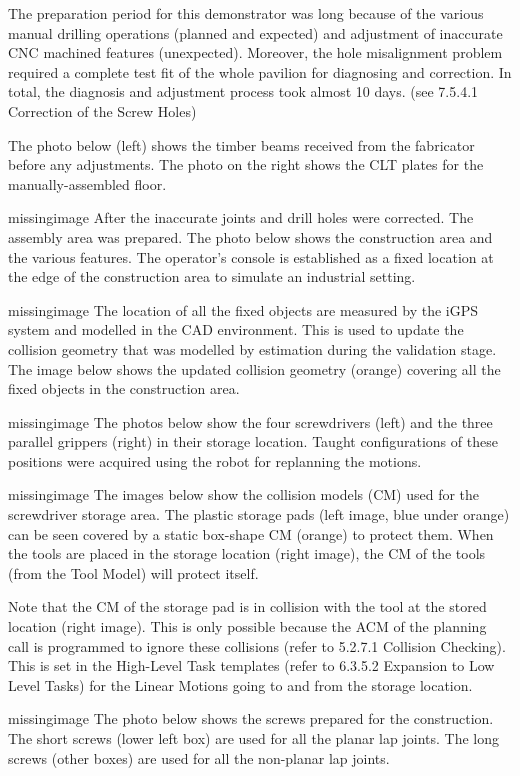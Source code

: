The preparation period for this demonstrator was long because of the various manual drilling operations (planned and expected) and adjustment of inaccurate CNC machined features (unexpected). Moreover, the hole misalignment problem required a complete test fit of the whole pavilion for diagnosing and correction. In total, the diagnosis and adjustment process took almost 10 days. (see 7.5.4.1 Correction of the Screw Holes)

The photo below (left) shows the timber beams received from the fabricator before any adjustments. The photo on the right shows the CLT plates for the manually-assembled floor.

missingimage
After the inaccurate joints and drill holes were corrected. The assembly area was prepared. The photo below shows the construction area and the various features. The operator’s console is established as a fixed location at the edge of the construction area to simulate an industrial setting.

missingimage
The location of all the fixed objects are measured by the iGPS system and modelled in the CAD environment. This is used to update the collision geometry that was modelled by estimation during the validation stage. The image below shows the updated collision geometry (orange) covering all the fixed objects in the construction area. 

missingimage
The photos below show the four screwdrivers (left) and the three parallel grippers (right) in their storage location. Taught configurations of these positions were acquired using the robot for replanning the motions. 

missingimage
The images below show the collision models (CM) used for the screwdriver storage area. The plastic storage pads (left image, blue under orange) can be seen covered by a static box-shape CM (orange) to protect them. When the tools are placed in the storage location (right image), the CM of the tools (from the Tool Model) will protect itself.

Note that the CM of the storage pad is in collision with the tool at the stored location (right image). This is only possible because the ACM of the planning call is programmed to ignore these collisions (refer to 5.2.7.1 Collision Checking). This is set in the High-Level Task templates (refer to 6.3.5.2 Expansion to Low Level Tasks) for the Linear Motions going to and from the storage location.

missingimage
The photo below shows the screws prepared for the construction. The short screws (lower left box) are used for all the planar lap joints. The long screws (other boxes) are used for all the non-planar lap joints.

